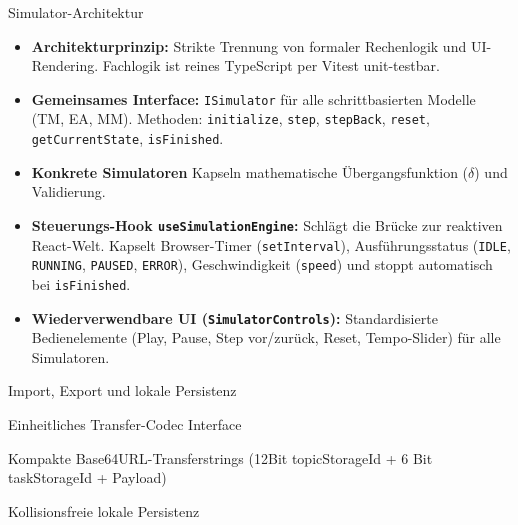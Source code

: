 \documentclass[aspectratio=169]{beamer}
\begin{document}
\begin{contentsframe}{Simulator-Architektur}
{    \begin{itemize}
      \item \textbf{Architekturprinzip:} Strikte Trennung von formaler Rechenlogik und UI-Rendering. Fachlogik ist reines TypeScript per Vitest unit-testbar.
      \item \textbf{Gemeinsames Interface:} \texttt{ISimulator} für alle schrittbasierten Modelle (TM, EA, MM). Methoden: \texttt{initialize}, \texttt{step}, \texttt{stepBack}, \texttt{reset}, \texttt{getCurrentState}, \texttt{isFinished}.
      \item \textbf{Konkrete Simulatoren} Kapseln mathematische Übergangsfunktion ($\delta$) und Validierung.
      \item \textbf{Steuerungs-Hook \texttt{useSimulationEngine}:} Schlägt die Brücke zur reaktiven React-Welt. Kapselt Browser-Timer (\texttt{setInterval}), Ausführungsstatus (\texttt{IDLE}, \texttt{RUNNING}, \texttt{PAUSED}, \texttt{ERROR}), Geschwindigkeit (\texttt{speed}) und stoppt automatisch bei \texttt{isFinished}.
      \item \textbf{Wiederverwendbare UI (\texttt{SimulatorControls}):} Standardisierte Bedienelemente (Play, Pause, Step vor/zurück, Reset, Tempo-Slider) für alle Simulatoren.
    \end{itemize}
  }
\end{contentsframe}

\begin{itemframe}{Import, Export und lokale Persistenz}
  \item Einheitliches Transfer-Codec Interface
          \vspace{1em}
  \item Kompakte Base64URL-Transferstrings (12Bit topicStorageId + 6 Bit taskStorageId + Payload)
          \vspace{1em}
  \item Kollisionsfreie lokale Persistenz

  \end{itemframe}
\end{document}

